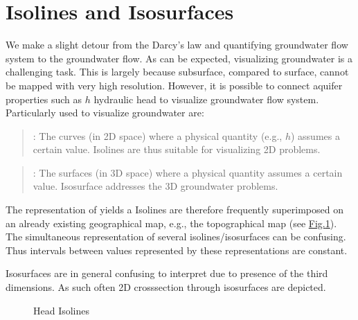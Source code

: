 \documentclass[letterpaper,10pt,english]{jupyterBook}
\begin{document}
\section{Isolines and Isosurfaces}
\label{\detokenize{content/flow/L6/16_darcy_law_3D:isolines-and-isosurfaces}}
\sphinxAtStartPar
We make a slight detour from the Darcy’s law and quantifying groundwater flow system to  the groundwater flow. As can be expected, visualizing groundwater is a challenging task. This is largely because sub\sphinxhyphen{}surface, compared to surface, cannot be mapped with very high resolution. However, it is possible to connect aquifer properties such as \(h\) hydraulic head to visualize groundwater flow system. Particularly used to visualize groundwater are:
\begin{quote}

\sphinxAtStartPar
{}: The curves (in 2D space) where a physical quantity (e.g., \(h\)) assumes a certain value. Isolines are thus suitable for visualizing 2D problems.
\end{quote}
\begin{quote}

\sphinxAtStartPar
{}: The surfaces (in 3D space) where a physical quantity assumes a certain value. Isosurface addresses the 3D groundwater problems.
\end{quote}

\sphinxAtStartPar
The representation of  yields a  Isolines are therefore frequently superimposed on an already existing geographical map, e.g., the topographical map (see \hyperref[\detokenize{content/flow/L6/16_darcy_law_3D:isolines}]{Fig.\@ \ref{\detokenize{content/flow/L6/16_darcy_law_3D:isolines}}}). The simultaneous representation of several isolines/isosurfaces can be confusing. Thus intervals between values represented by these representations are constant.

\sphinxAtStartPar
Isosurfaces are in general confusing to interpret due to presence of the third dimensions. As such often 2D cross\sphinxhyphen{}section through isosurfaces are depicted.

\begin{figure}[htbp]
\centering
\capstart

\noindent{}
\caption{Head Isolines}\label{\detokenize{content/flow/L6/16_darcy_law_3D:isolines}}\end{figure}
\end{document}
